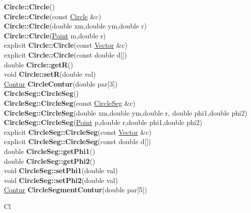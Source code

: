 \documentclass[10pt,titlepage]{article}
\def\functionlistentry#1#2#3#4#5#6{\noindent #1 {\bf #2}(#3) \dotfill #6\\}
\def\letterref#1{}
\def\letterlabel#1{\vspace{0.5cm}\centerline{\Large #1}}
\def\letterlabelend#1{}
\begin{document}
{{\letterref{Ca}
\letterref{Ce}
\letterref{Ch}
\letterref{Ci}
\letterref{Cl}
\letterref{Co}
\letterref{Cr}
\letterref{Cu}
\letterlabelend{Ci}
\functionlistentry{}{Circle::Circle}{}{514}{geoObject}{}
\functionlistentry{}{Circle::Circle}{const \hyperlink{Circle}{Circle} \&c}{515}{geoObject}{}
\functionlistentry{}{Circle::Circle}{double xm,double ym,double r}{516}{geoObject}{}
\functionlistentry{}{Circle::Circle}{\hyperlink{Point}{Point} m,double r}{517}{geoObject}{}
\functionlistentry{explicit}{Circle::Circle}{const \hyperlink{Vector}{Vector} \&c}{518}{geoObject}{}
\functionlistentry{explicit}{Circle::Circle}{const double d[]}{519}{geoObject}{}
\functionlistentry{double}{Circle::getR}{}{520}{geoObject}{}
\functionlistentry{void}{Circle::setR}{double val}{521}{geoObject}{}
\functionlistentry{\hyperlink{Contur}{Contur}}{CircleContur}{double par[3]}{1332}{graphics}{}
\functionlistentry{}{CircleSeg::CircleSeg}{}{522}{geoObject}{}
\functionlistentry{}{CircleSeg::CircleSeg}{const \hyperlink{CircleSeg}{CircleSeg} \&c}{523}{geoObject}{}
\functionlistentry{}{CircleSeg::CircleSeg}{double xm,double ym,double r, double phi1,double phi2}{524}{geoObject}{}
\functionlistentry{}{CircleSeg::CircleSeg}{\hyperlink{Point}{Point} p,double r,double phi1,double phi2}{525}{geoObject}{}
\functionlistentry{explicit}{CircleSeg::CircleSeg}{const \hyperlink{Vector}{Vector} \&c}{526}{geoObject}{}
\functionlistentry{explicit}{CircleSeg::CircleSeg}{const double d[]}{527}{geoObject}{}
\functionlistentry{double }{CircleSeg::getPhi1}{}{528}{geoObject}{}
\functionlistentry{double}{CircleSeg::getPhi2}{}{530}{geoObject}{}
\functionlistentry{void}{CircleSeg::setPhi1}{double val}{529}{geoObject}{}
\functionlistentry{void}{CircleSeg::setPhi2}{double val}{531}{geoObject}{}
\functionlistentry{\hyperlink{Contur}{Contur}}{CircleSegmentContur}{double par[5]}{1334}{graphics}{}

\letterlabel{Cl}
\letterref{A}
\letterref{B}
\letterref{C}
\letterref{D}
\letterref{E}
\letterref{F}
\letterref{G}
\letterref{H}
\letterref{I}
\letterref{K}
\letterref{L}
\letterref{M}
\letterref{N}
\letterref{O}
\letterref{P}
\letterref{Q}
\letterref{R}
\letterref{S}
\letterref{T}
\letterref{U}
\letterref{V}
\letterref{W}
\letterref{X}
\letterref{Y}
\letterref{Z}

}}
\end{document}
